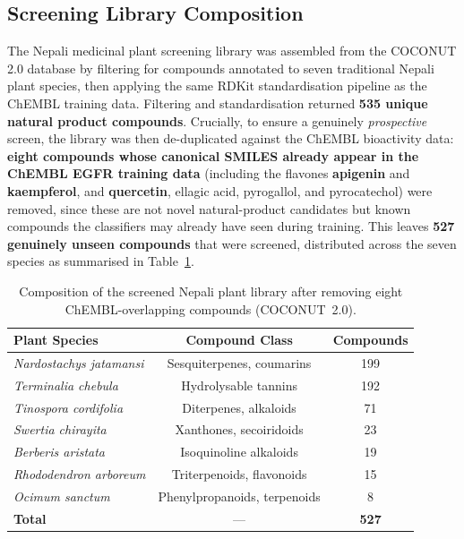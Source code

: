\subsection{Screening Library Composition}

The Nepali medicinal plant screening library was assembled from the COCONUT 2.0
database by filtering for compounds annotated to seven traditional Nepali plant
species, then applying the same RDKit standardisation pipeline as the ChEMBL training
data. Filtering and standardisation returned \textbf{535 unique natural product
compounds}. Crucially, to ensure a genuinely \emph{prospective} screen, the library
was then de-duplicated against the ChEMBL bioactivity data: \textbf{eight compounds
whose canonical SMILES already appear in the ChEMBL EGFR training data} (including the flavones
\textbf{apigenin} and \textbf{kaempferol}, and \textbf{quercetin}, ellagic acid,
pyrogallol, and pyrocatechol) were removed, since these are not novel natural-product
candidates but known compounds the classifiers may already have seen during training.
This leaves \textbf{527 genuinely unseen compounds} that were screened, distributed
across the seven species as summarised in Table~\ref{tab:library_comp}.

\begin{table}[H]
\centering
\caption{Composition of the screened Nepali plant library after removing eight ChEMBL-overlapping compounds (COCONUT~2.0).}
\label{tab:library_comp}
{\singlespacing
\begin{tabular}{lcc}
\toprule
\textbf{Plant Species} & \textbf{Compound Class} & \textbf{Compounds} \\
\midrule
\textit{Nardostachys jatamansi} & Sesquiterpenes, coumarins    & 199 \\
\textit{Terminalia chebula}     & Hydrolysable tannins         & 192 \\
\textit{Tinospora cordifolia}   & Diterpenes, alkaloids        & 71 \\
\textit{Swertia chirayita}      & Xanthones, secoiridoids      & 23 \\
\textit{Berberis aristata}      & Isoquinoline alkaloids       & 19 \\
\textit{Rhododendron arboreum}  & Triterpenoids, flavonoids    & 15 \\
\textit{Ocimum sanctum}         & Phenylpropanoids, terpenoids & 8  \\
\midrule
\textbf{Total} & --- & \textbf{527} \\
\bottomrule
\end{tabular}
}
\end{table}

